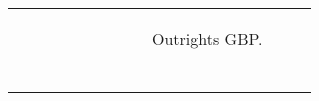 \documentclass[a4paper,twoside]{report}
\begin{document}
 
\begin{figure}[htbp]
 \begin{tabular}[c]{cc}
 \begin{subfigure}[c]{0.5\textwidth}
 
 \end{subfigure}&
 \begin{subfigure}[c]{0.5\textwidth}
 \caption{Outrights GBP.}
 \label{fig:Outrights GBP}
 
 \null\hfill
 \end{subfigure}\\
 
 
 \begin{subfigure}[c]{0.5\textwidth}
 
 \null\hfill 
 \end{subfigure}&
 

\end{tabular}
\end{figure}
\end{document}
